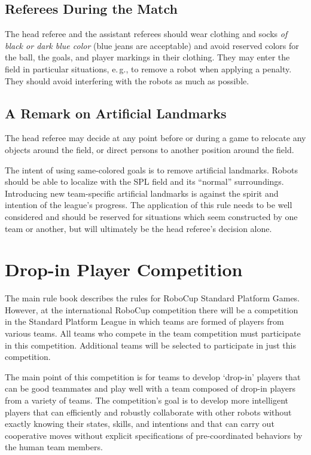 \documentclass[12pt]{article}
\newcommand{\eg}{\mbox{e.\,g.}\xspace}
\begin{document}
\subsection{Referees During the Match}

The head referee and the assistant referees should wear clothing and socks \emph{of black or dark blue color} (blue jeans are acceptable) and avoid reserved colors for the ball, the goals, and player markings in their clothing. They may enter the field in particular situations, \eg, to remove a robot when applying a penalty. They should avoid interfering with the robots as much as possible.

\subsection{A Remark on Artificial Landmarks}
\label{sec:judgement:landmarks}

The head referee may decide at any point before or during a game to relocate any objects around the field, or direct persons to another position around the field.

The intent of using same-colored goals is to remove artificial landmarks.
Robots should be able to localize with the SPL field and its ``normal'' surroundings.
Introducing new team-specific artificial landmarks is against the spirit and intention of the league's progress.
The application of this rule needs to be well considered and should be reserved for situations which seem constructed by one team or another, but will ultimately be the head referee's decision alone.


\newpage


\appendix
\section{Drop-in Player Competition}
\label{sec:drop-in}
The main rule book describes the rules for RoboCup Standard Platform Games.  However, at the international RoboCup competition there will be a competition in the Standard Platform League in which teams are formed of players from various teams.  All teams who compete in the team competition must participate in this competition.  Additional teams will be selected to participate in just this competition.

The main point of this competition is for teams to develop `drop-in' players that can be good teammates and play well with a team composed of drop-in players from a variety of teams. The competition's goal is to develop more intelligent players that can efficiently and robustly collaborate with other robots without exactly knowing their states, skills, and intentions and that can carry out cooperative moves without explicit specifications of pre-coordinated behaviors by the human team members.
\end{document}
